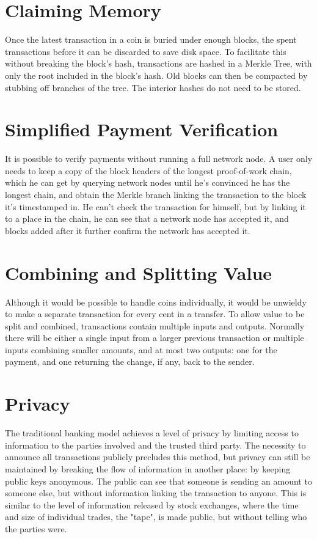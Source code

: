\documentclass[a4paper,12pt]{report}
\begin{document}
\section{Claiming Memory}
Once the latest transaction in a coin is buried under enough blocks, the spent transactions before
it can be discarded to save disk space. To facilitate this without breaking the block's hash,
transactions are hashed in a Merkle Tree, with only the root included in the block's hash.
Old blocks can then be compacted by stubbing off branches of the tree. The interior hashes do
not need to be stored.

\section{Simplified Payment Verification}
It is possible to verify payments without running a full network node. A user only needs to keep
a copy of the block headers of the longest proof-of-work chain, which he can get by querying
network nodes until he's convinced he has the longest chain, and obtain the Merkle branch
linking the transaction to the block it's timestamped in. He can't check the transaction for
himself, but by linking it to a place in the chain, he can see that a network node has accepted it,
and blocks added after it further confirm the network has accepted it.

\section{Combining and Splitting Value}
Although it would be possible to handle coins individually, it would be unwieldy to make a
separate transaction for every cent in a transfer. To allow value to be split and combined,
transactions contain multiple inputs and outputs. Normally there will be either a single input
from a larger previous transaction or multiple inputs combining smaller amounts, and at most two
outputs: one for the payment, and one returning the change, if any, back to the sender.

\section{Privacy}
The traditional banking model achieves a level of privacy by limiting access to information to the
parties involved and the trusted third party. The necessity to announce all transactions publicly
precludes this method, but privacy can still be maintained by breaking the flow of information in
another place: by keeping public keys anonymous. The public can see that someone is sending
an amount to someone else, but without information linking the transaction to anyone. This is
similar to the level of information released by stock exchanges, where the time and size of
individual trades, the "tape", is made public, but without telling who the parties were.
\end{document}
